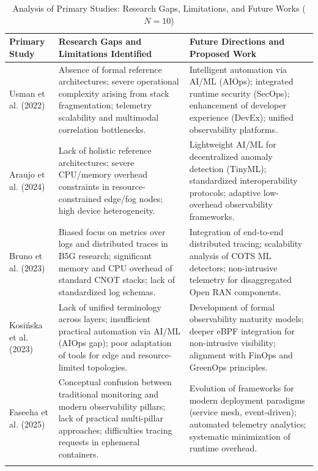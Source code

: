 \begin{table}[!ht]
\centering
\caption{Analysis of Primary Studies: Research Gaps, Limitations, and Future Works ($N = 10$)}
\label{tab:related_works}
\footnotesize
\begin{tabular}{p{} p{} p{}}
\toprule
\textbf{Primary Study} & \textbf{Research Gaps and Limitations Identified} & \textbf{Future Directions and Proposed Work} \\ \midrule

Usman et al. (2022) \cite{usman_2022} &
Absence of formal reference architectures; severe operational complexity arising from stack fragmentation; telemetry scalability and multimodal correlation bottlenecks. & 
Intelligent automation via AI/ML (AIOps); integrated runtime security (SecOps); enhancement of developer experience (DevEx); unified observability platforms. \\ \addlinespace

Araujo et al. (2024) \cite{araujo_2024} &
Lack of holistic reference architectures; severe CPU/memory overhead constraints in resource-constrained edge/fog nodes; high device heterogeneity. & 
Lightweight AI/ML for decentralized anomaly detection (TinyML); standardized interoperability protocols; adaptive low-overhead observability frameworks. \\ \addlinespace

Bruno et al. (2023) \cite{zanatta_23} &
Biased focus on metrics over logs and distributed traces in B5G research; significant memory and CPU overhead of standard CNOT stacks; lack of standardized log schemas. & 
Integration of end-to-end distributed tracing; scalability analysis of COTS ML detectors; non-intrusive telemetry for disaggregated Open RAN components. \\ \addlinespace

Kosińska et al. (2023) \cite{kosinska_2023} &
Lack of unified terminology across layers; insufficient practical automation via AI/ML (AIOps gap); poor adaptation of tools for edge and resource-limited topologies. & 
Development of formal observability maturity models; deeper eBPF integration for non-intrusive visibility; alignment with FinOps and GreenOps principles. \\ \addlinespace

Faseeha et al. (2025) \cite{faseeha_2025} &
Conceptual confusion between traditional monitoring and modern observability pillars; lack of practical multi-pillar approaches; difficulties tracing requests in ephemeral containers. & 
Evolution of frameworks for modern deployment paradigms (service mesh, event-driven); automated telemetry analytics; systematic minimization of runtime overhead. \\ \addlinespace


\end{tabular}
\end{table}
